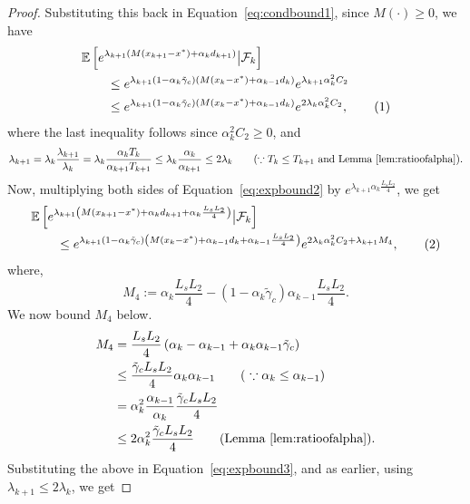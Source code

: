 \documentclass{article}
\newcommand{\numberthis}{\addtocounter{equation}{1}\tag{\theequation}}
\newcommand{\lrp}[1]{\left( #1 \right)}
\newcommand{\lrs}[1]{\left[ #1 \right]}
\newcommand{\E}[1]{\mathbb{E}\lrs{#1}}
\newcommand{\xk}{x_k}
\begin{document}
\begin{proof}
    Substituting this back in Equation~\eqref{eq:condbound1}, since $M(\cdot) \ge 0$, we have
    \begin{align*}
        &\E{ e^{\lambda_{k+1}\lrp{M(x_{k+1} - x^*) + \alpha_k d_{k+1}}} \big| \mathcal F_k }\\
        &\qquad \le e^{ \lambda_{k+1}(1-\alpha_k \tilde{\gamma}_c)\lrp{M(\xk - x^*) + \alpha_{k-1}d_k  }} e^{\lambda_{k+1} \alpha^2_k C_2}\\
        &\qquad \le e^{ \lambda_{k+1}(1-\alpha_k \tilde{\gamma}_c)\lrp{M(\xk - x^*) + \alpha_{k-1}d_k  }}  e^{2 \lambda_k \alpha^2_k C_2}, \numberthis\label{eq:expbound2}
    \end{align*}
    where the last inequality follows since $\alpha^2_k C_2 \ge 0$, and 
    \begin{equation*}
        \lambda_{k+1} = \lambda_k\frac{\lambda_{k+1}}{\lambda_k} = \lambda_k\frac{\alpha_k T_k}{\alpha_{k+1}T_{k+1}} \le \lambda_k\frac{\alpha_k}{\alpha_{k+1}} \le 2\lambda_k \tag{$\because   T_k \le T_{k+1}$ and Lemma~\ref{lem:ratioofalpha}}. 
    \end{equation*}
    Now, multiplying both sides of Equation~\eqref{eq:expbound2} by $e^{\lambda_{k+1}\alpha_k\frac{ L_s L_2}{4} }$, we get
\begin{align*}
        &\E{ e^{\lambda_{k+1}\lrp{M(x_{k+1} - x^*) + \alpha_k d_{k+1} + \alpha_k\frac{ L_s L_2}{4} }} \big| \mathcal F_k }\\
        &\qquad \le e^{ \lambda_{k+1}(1-\alpha_k \tilde{\gamma}_c)\lrp{M(\xk - x^*) + \alpha_{k-1}d_k + \alpha_{k-1}\frac{ L_s L_2}{4} } }  e^{2 \lambda_k \alpha^2_k C_2 + \lambda_{k+1} M_4}, \numberthis\label{eq:expbound3}
\end{align*}    
where,
\[ M_4 :=  \alpha_k\frac{ L_s L_2}{4}- (1-\alpha_k \tilde{\gamma}_c) \alpha_{k-1}\frac{ L_s L_2}{4}.\]
We now bound $M_4$ below. 
\begin{align*}
    M_4 &=  \frac{ L_s L_2}{4}\lrp{\alpha_k - \alpha_{k-1} + \alpha_k \alpha_{k-1}\tilde{\gamma}_c}\\
    &\le  \frac{ \tilde{\gamma}_cL_s L_2}{4}\alpha_k \alpha_{k-1} \tag{ $\because \alpha_k \le \alpha_{k-1}$}\\
    &= \alpha^2_k\frac{\alpha_{k-1}}{\alpha_k} \frac{ \tilde{\gamma}_cL_s L_2}{4}\\
    &\le 2 \alpha^2_k\frac{ \tilde{\gamma}_cL_s L_2}{4} \tag{Lemma~\ref{lem:ratioofalpha}}.
\end{align*}
Substituting the above in Equation~\eqref{eq:expbound3}, and as earlier, using $\lambda_{k+1} \le 2 \lambda_k$, we get

\end{proof}
\end{document}
